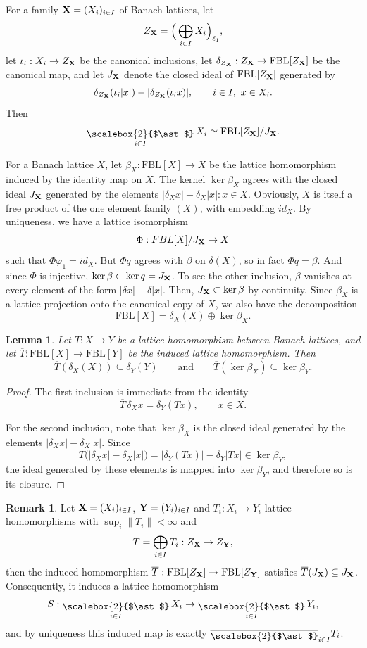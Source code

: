 \documentclass[12pt]{amsart}
\newcommand{\FBL}{\mathrm{FBL}}
\DeclareMathOperator*{\bigfree}{\raisebox{-0.6ex}{\scalebox{2}{$\ast$}}}
\theoremstyle{plain}
\newtheorem{lemma}[theorem]{Lemma}
\theoremstyle{definition}
\newtheorem{remark}[theorem]{Remark}
\begin{document}
For a family $\bold{X}=(X_i)_{i\in I}$ of Banach lattices, let
\[
Z_{\bold{X}}=\Big(\bigoplus_{i\in I}X_i\Big)_{\ell_1},
\]
let $\iota_i:X_i\to Z_{\bold{X}}$ be the canonical inclusions, let $\delta_{Z_\bold{X}}:Z_{\bold{X}}\to \FBL[Z_{\bold{X}}]$ be the canonical map, and let $J_{\bold{X}}$ denote the closed ideal of $\FBL[Z_{\bold{X}}]$ generated by
\[
\delta_{Z_\bold{X}}(\iota_i|x|)-|\delta_{Z_{\bold{X}}}(\iota_i x)|,
\qquad i\in I,\ x\in X_i.
\]
Then
\[
\bigfree_{i\in I}X_i \simeq \FBL[Z_{\bold{X}}]/J_{\bold{X}}.
\]

For a Banach lattice $X$, let $\beta_X:\FBL[X]\to X$ be the lattice homomorphism induced by the identity map on $X$. The kernel $\ker\beta_X$ agrees with the closed ideal $J_{\bold X}$ generated by the elements $|\delta_X x|-\delta_X|x|:x\in X$. Obviously, $X$ is itself a free product of the one element family $(X)$, with embedding $id_X$. By uniqueness, we have a lattice isomorphism \[
\Phi:FBL[X]/J_{\bold X}\rightarrow X
\]
such that $\Phi\varphi_1=id_X$. But $\Phi q$ agrees with $\beta$ on $\delta(X)$, so in fact $\Phi q=\beta$. And since $\Phi$ is injective, $\ker\beta\subset \ker q=J_{\bold X}$. To see the other inclusion, $\beta$ vanishes at every element of the form $|\delta x|-\delta|x|$. Then, $J_{\bold X}\subset \ker\beta$ by continuity. Since $\beta_X$ is a lattice projection onto the canonical copy of $X$, we also have the decomposition
\[
\FBL[X]=\delta_X(X)\oplus \ker \beta_X.
\]

\begin{lemma}
Let $T:X\to Y$ be a lattice homomorphism between Banach lattices, and let $\overline{T}:\FBL[X]\to \FBL[Y]$ be the induced lattice homomorphism. Then
\[
\overline{T}(\delta_X(X))\subseteq \delta_Y(Y)
\qquad\text{and}\qquad
\overline{T}(\ker \beta_X)\subseteq \ker \beta_Y.
\]
\end{lemma}

\begin{proof}
The first inclusion is immediate from the identity
\[
\overline{T}\,\delta_X x=\delta_Y(Tx),
\qquad x\in X.
\]

For the second inclusion, note that $\ker\beta_X$ is the closed ideal generated by the elements $|\delta_X x|-\delta_X|x|$. Since
\[
\overline{T}\bigl(|\delta_X x|-\delta_X|x|\bigr)
=
|\delta_Y(Tx)|-\delta_Y|Tx|
\in \ker\beta_Y,
\]
the ideal generated by these elements is mapped into $\ker\beta_Y$, and therefore so is its closure.
\end{proof}

\begin{remark}
Let $\bold{X}=(X_i)_{i\in I}$, $\bold{Y}=(Y_i)_{i\in I}$ and $T_i:X_i\to Y_i$ lattice homomorphisms with $\sup_i\|T_i\|<\infty$ and
\[
T=\bigoplus_{i\in I}T_i:Z_{\bold{X}}\to Z_{\bold{Y}},
\]
then the induced homomorphism $\overline{T}:\FBL[Z_{\bold{X}}]\to \FBL[Z_{\bold{Y}}]$ satisfies $\overline{T}(J_\bold{X})\subseteq J_{\bold{X}}$. Consequently, it induces a lattice homomorphism
\[
S:\bigfree_{i\in I}X_i\to \bigfree_{i\in I}Y_i,
\]
and by uniqueness this induced map is exactly $\overline{\bigfree}_{i\in I}T_i$.
\end{remark}
\end{document}
